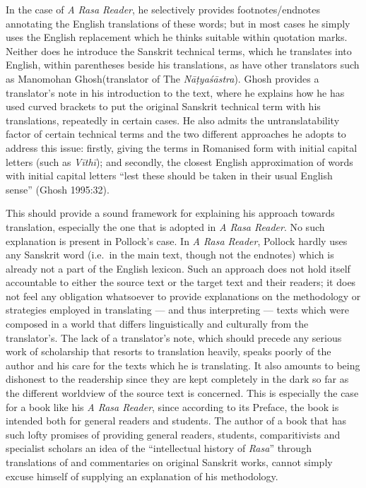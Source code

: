In the case of \textsl{A Rasa Reader}, he selectively provides footnotes/endnotes annotating the English translations of these words; but in most cases he simply uses the English replacement which he thinks suitable within quotation marks. Neither does he introduce the Sanskrit technical terms, which he translates into English, within parentheses beside his translations, as have other translators such as Manomohan Ghosh\break (translator of The \textsl{Nāṭyaśāstra}). Ghosh provides a translator’s note in his introduction to the text, where he explains how he has used curved brackets to put the original Sanskrit technical term with his translations, repeatedly in certain cases. He also admits the untranslatability factor of certain technical terms and the two different approaches he adopts to address this issue: firstly, giving the terms in Romanised form with initial capital letters (such as \textsl{Vīthī}); and secondly, the closest English approximation of words with initial capital letters “lest these should be taken in their usual English sense” (Ghosh 1995:32). 

This should provide a sound framework for explaining his approach towards translation, especially the one that is adopted in \textsl{A Rasa Reader}. No such explanation is present in Pollock’s case. In \textsl{A Rasa Reader}, Pollock hardly uses any Sanskrit word (i.e.~in the main text, though not the endnotes) which is already not a part of the English lexicon. Such an approach does not hold itself accountable to either the source text or the target text and their readers; it does not feel any obligation whatsoever to provide explanations on the methodology or strategies employed in translating --- and thus interpreting --- texts which were composed in a world that differs linguistically and culturally from the translator’s. The lack of a translator’s note, which should precede any serious work of scholarship that resorts to translation heavily, speaks poorly of the author and his care for the texts which he is translating. It also amounts to being dishonest to the readership since they are kept completely in the dark so far as the different worldview of the source text is concerned. This is especially the case for a book like his \textsl{A Rasa Reader}, since according to its Preface, the book is intended both for general readers and students. The author of a book that has such lofty promises of providing general readers, students, comparitivists and specialist scholars an idea of the “intellectual history of \textsl{Rasa}” through translations of and commentaries on original Sanskrit works, cannot simply excuse himself of supplying an explanation of his methodology.

